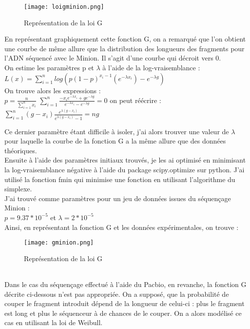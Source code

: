 \documentclass[11pt,a4paper]{article} %
\begin{document}
\begin{figure}[h]
  \centering
  \texttt{[image: loigminion.png]}
  \caption{\small Représentation de la loi G}
\end{figure}

En représentant graphiquement cette fonction G, on a remarqué que l'on obtient une courbe de même allure que la distribution des longueurs des fragments pour l'ADN séquencé avec le Minion. Il s'agit d'une courbe qui décroit vers 0.\\

On estime les paramètres p et $\lambda$ à l'aide de la log-vraisemblance : \\
$L(x) =  \sum_{i=1}^{n} log(p(1-p)^{x_{i}-1}(e^{-\lambda x_{i}})-e^{-\lambda g})$\\
On trouve alors les expressions : \\

$p = \frac{n}{\sum_{i=1}^{n} x_{i}}$
$\sum_{i=1}^{n}\frac{-x_{i}e^{-\lambda x_{i}}+ge^{-\lambda g }}{e^{-\lambda  x_{i}}-e^{-\lambda g }}=0 $ 
on peut réécrire : $\sum_{i=1}^{n}(g-x_{i})\frac{e^{\lambda(g-x_{i})}}{e^{\lambda(g-x_{i})}-1}=ng$

Ce dernier paramètre étant difficile à isoler, j'ai alors trouver une valeur de $\lambda$ pour laquelle la courbe de la fonction G a la même allure que des données théoriques.\\
Ensuite à l'aide des paramètres initiaux trouvés, je les ai optimisé en minimisant la log-vraisemblance négative à l'aide du package scipy.optimize sur python. J'ai utilisé la fonction fmin qui minimise une fonction en utilisant l'algorithme du simplexe.\\
J'ai trouvé comme paramètres pour un jeu de données issues du séquençage Minion :\\ 
$p = 9.37*10^{-5}$ et $\lambda = 2*10^{-5}$ \\
Ainsi, en représentant la fonction G et les données expérimentales, on trouve : \\
\begin{figure}[h]
  \centering
  \texttt{[image: gminion.png]}
  \caption{\small Représentation de la loi G}
\end{figure}\\

Dans le cas du séquençage effectué à l'aide du Pacbio, en revanche, la fonction G décrite ci-dessous n'est pas appropriée. On a supposé, que la probabilité de couper le fragment introduit dépend de la longueur de celui-ci : plus le fragment est long et plus le séquenceur à de chances de le couper. On a alors modélisé ce cas en utilisant la loi de Weibull.\\
\end{document}
